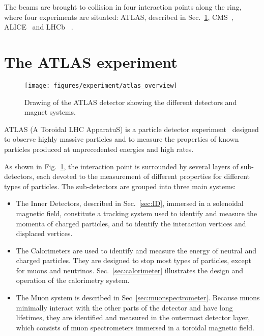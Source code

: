 The beams are brought to collision in four interaction points along
the ring, where four experiments are situated: 
ATLAS, described in Sec.~\ref{sec:ATLAS}, CMS~\cite{cms}, ALICE~\cite{alice} and LHCb~\cite{lhcb} .

\section{The ATLAS experiment}
\label{sec:ATLAS}

\begin{figure}[ht]
\begin{center}
\texttt{[image: figures/experiment/atlas\_overview]}
\caption[Drawing of the ATLAS detector]{
  Drawing of the ATLAS detector showing the different detectors and magnet systems.}
\label{fig:ATLAS}
\end{center}
\end{figure}

ATLAS (A Toroidal LHC ApparatuS) is a particle detector
experiment~\cite{detectorpaper} designed to observe highly massive
particles and to measure the properties of known particles produced at
unprecedented energies and high rates. 

As shown in Fig.~\ref{fig:ATLAS}, the interaction point is surrounded
by several layers of sub-detectors, each devoted to the measurement of
different properties for different types of particles.
The sub-detectors are grouped into three main systems:

\begin{itemize}
\item The Inner Detectors, described in Sec.~\ref{sec:ID}, immersed in
  a solenoidal magnetic field, constitute a tracking system used to
  identify and measure the momenta of charged particles, and to identify
  the interaction vertices and displaced vertices. 
\item The Calorimeters are used to identify and measure the energy of
  neutral and charged particles. They are designed to stop most types
  of particles, except for muons and
  neutrinos. Sec.~\ref{sec:calorimeter} illustrates the design and
  operation of the calorimetry system.
\item The Muon system is described in
  Sec~\ref{sec:muonspectrometer}. Because muons minimally interact
  with the other parts of the detector and have long lifetimes, they
  are identified and measured in the outermost detector
  layer, which consists of muon spectrometers immersed in a toroidal magnetic field. 
\end{itemize}


